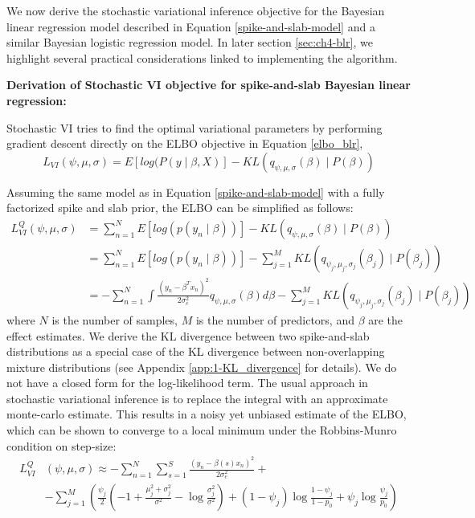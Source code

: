 %
We now derive the stochastic variational inference objective for the Bayesian linear regression model described in Equation \ref{spike-and-slab-model} and a similar Bayesian logistic regression model.
%
In later section \ref{sec:ch4-blr}, we highlight several practical considerations linked to implementing the algorithm.
%

\newpage

\noindent \textbf{Derivation of Stochastic VI objective for spike-and-slab Bayesian linear regression:}
%

%
Stochastic VI tries to find the optimal variational parameters by performing gradient descent directly on the ELBO objective in Equation \ref{elbo_blr},
\begin{equation}
    L_{VI}(\psi, \mu, \sigma) = E[log(P( y \mid \beta,X)] - KL(q_{\psi, \mu, \sigma}(\beta) \mid P(\beta))
\end{equation}

%
Assuming the same model as in Equation \ref{spike-and-slab-model} with a fully factorized spike and slab prior, the ELBO can be simplified as follows:
\begin{align}
 L^{Q}_{VI}(\psi, \mu, \sigma) &= \sum\limits^{N}_{n=1} E[log(p(y_{n} \mid \beta))] - KL(q_{\psi, \mu, \sigma}(\beta) \mid P(\beta)) \nonumber \\
 &= \sum\limits^{N}_{n=1} E[log(p(y_{n} \mid \beta))] - \sum\limits^{M}_{j=1} KL(q_{\psi_j, \mu_j, \sigma_j}(\beta_j) \mid P(\beta_j)) \nonumber \\
 &= - \sum\limits^{N}_{n=1} \int \frac{(y_n - \beta^T x_n)^2}{2 \sigma_e^2} q_{\psi, \mu, \sigma}(\beta) d\beta - \sum\limits^{M}_{j=1} KL(q_{\psi_j, \mu_j, \sigma_j}(\beta_j) \mid P(\beta_j)) \label{spike-and-slab-1}
\end{align}
where $N$ is the number of samples, $M$ is the number of predictors, and $\beta$ are the effect estimates.
%
We derive the KL divergence between two spike-and-slab distributions as a special case of the KL divergence between non-overlapping mixture distributions (see Appendix \ref{app:1-KL_divergence} for details).
%
We do not have a closed form for the log-likelihood term.
%
The usual approach in stochastic variational inference is to replace the integral with an approximate monte-carlo estimate.
%
This results in a noisy yet unbiased estimate of the ELBO, which can be shown to converge to a local minimum under the Robbins-Munro condition \cite{robbins1951stochastic} on step-size:
\begin{align}
    L^{Q}_{VI}&(\psi, \mu, \sigma) \approx - \sum\limits^{N}_{n=1} \sum\limits^{S}_{s=1} \frac{(y_n - \beta(s) x_n)^2}{2 \sigma_e^2} + \nonumber \\
    &- \sum\limits^{M}_{j=1} \left(  \frac{\psi_j}{2}\left(-1 + \frac{\mu_j^2 + \sigma_j^2}{\sigma^2} - \log \frac{\sigma_j^2}{\sigma^2} \right) + (1-\psi_j)\log\frac{1 - \psi_j}{1 - p_0} + \psi_j\log\frac{\psi_j}{p_0} \right )
\end{align}

